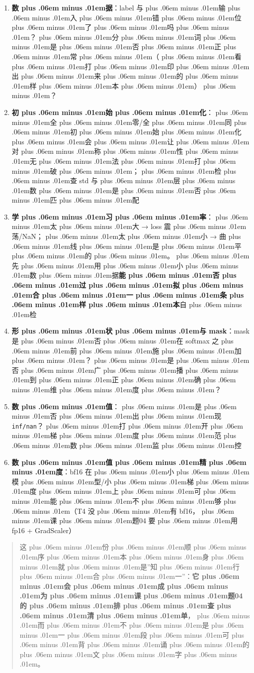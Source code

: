 \documentclass[
]{article}
\newcommand{\passthrough}[1]{#1}
\providecommand{\tightlist}{%
  \setlength{\itemsep}{0pt}\setlength{\parskip}{0pt}}
\def\zh#1{{\zhfont #1}}
\def\sym#1{{\symfont #1}}
\def\zhglue{\hskip0pt plus .06em minus .01em}
\begin{document}
\begin{enumerate}
\def\labelenumi{\arabic{enumi}.}
\tightlist
\item
  \textbf{\zh{数\zhglue 据}}\zh{：}label \zh{与\zhglue 输\zhglue 入\zhglue 错\zhglue 位\zhglue 了\zhglue 吗\zhglue ？\zhglue 分\zhglue 词\zhglue 是\zhglue 否\zhglue 正\zhglue 常\zhglue （\zhglue 看\zhglue 打\zhglue 印\zhglue 出\zhglue 来\zhglue 的\zhglue 样\zhglue 本\zhglue ）\zhglue ？}
\item
  \textbf{\zh{初\zhglue 始\zhglue 化}}\zh{：\zhglue 全\zhglue 零}/\zh{全\zhglue 同\zhglue 初\zhglue 始\zhglue 化\zhglue 会\zhglue 让\zhglue 对\zhglue 称\zhglue 性\zhglue 无\zhglue 法\zhglue 打\zhglue 破\zhglue ；\zhglue 检\zhglue 查} std \zh{与\zhglue 层\zhglue 数\zhglue 是\zhglue 否\zhglue 匹\zhglue 配}
\item
  \textbf{\zh{学\zhglue 习\zhglue 率}}\zh{：\zhglue 太\zhglue 大} \sym{→} loss \zh{震\zhglue 荡}/NaN\zh{；\zhglue 太\zhglue 小} \sym{→} \zh{曲\zhglue 线\zhglue 是\zhglue 平\zhglue 的\zhglue 。\zhglue 先\zhglue 用\zhglue 小\zhglue 数\zhglue 据}\textbf{\zh{能\zhglue 否\zhglue 过\zhglue 拟\zhglue 合\zhglue 一\zhglue 条\zhglue 样\zhglue 本}}\zh{自\zhglue 检}
\item
  \textbf{\zh{形\zhglue 状\zhglue 与} mask}\zh{：}mask \zh{是\zhglue 否\zhglue 在} softmax \zh{之\zhglue 前\zhglue 施\zhglue 加\zhglue ？\zhglue 是\zhglue 否\zhglue 广\zhglue 播\zhglue 到\zhglue 正\zhglue 确\zhglue 维\zhglue 度\zhglue ？}
\item
  \textbf{\zh{数\zhglue 值}}\zh{：\zhglue 是\zhglue 否\zhglue 出\zhglue 现} \passthrough{\lstinline!inf/nan!}\zh{？\zhglue 打\zhglue 开\zhglue 梯\zhglue 度\zhglue 范\zhglue 数\zhglue 监\zhglue 控}
\item
  \textbf{\zh{数\zhglue 值\zhglue 精\zhglue 度}}\zh{：}bf16 \zh{在\zhglue 小\zhglue 模\zhglue 型}/\zh{小\zhglue 梯\zhglue 度\zhglue 上\zhglue 可\zhglue 能\zhglue 不\zhglue 够\zhglue （}T4 \zh{没\zhglue 有} bf16\zh{，\zhglue 课\zhglue 题}04 \zh{要\zhglue 用} fp16 + GradScaler\zh{）}
\end{enumerate}

\begin{quote}
\zh{这\zhglue 份\zhglue 顺\zhglue 序\zhglue 本\zhglue 身\zhglue 就\zhglue 是}''\zh{知\zhglue 行\zhglue 合\zhglue 一}''\zh{：}\textbf{\zh{它\zhglue 会\zhglue 成\zhglue 为\zhglue 课\zhglue 题}04 \zh{的\zhglue 排\zhglue 查\zhglue 清\zhglue 单}}\zh{，\zhglue 而\zhglue 不\zhglue 是\zhglue 一\zhglue 段\zhglue 可\zhglue 背\zhglue 诵\zhglue 的\zhglue 文\zhglue 字\zhglue 。}
\end{quote}
\end{document}
